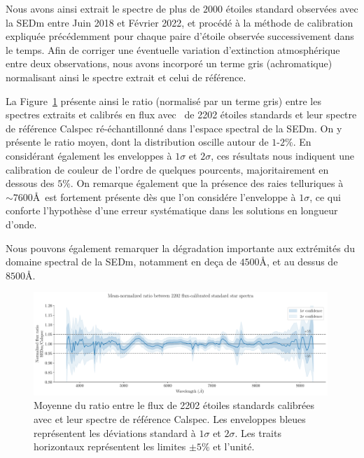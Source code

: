 \documentclass[../main/main.tex]{subfiles}
\begin{document}
Nous avons ainsi extrait le spectre de plus de $2000$ étoiles standard
observées avec la SEDm entre Juin 2018 et Février 2022, et procédé
à la méthode de calibration expliquée précédemment pour chaque paire d'étoile observée
successivement dans le temps.
Afin de corriger une éventuelle variation d'extinction atmosphérique
entre deux observations, nous avons incorporé un terme gris
(achromatique) normalisant ainsi le spectre extrait et celui de référence.

La Figure~\ref{fig:allratio_std} présente ainsi le ratio (normalisé par
un terme gris) entre les spectres extraits et calibrés en flux avec \hypergal\ de 2202 étoiles
standards et leur spectre de référence Calspec ré-échantillonné dans
l'espace spectral de la SEDm. On y présente le ratio moyen, dont la
distribution oscille autour de $1$-$2\%$. En considérant également les
enveloppes à $1\sigma$ et $2\sigma$, ces résultats nous indiquent une
calibration de couleur de l'ordre de quelques pourcents, majoritairement
en dessous des $5\%$. On remarque également que la présence des raies
telluriques à $\sim7600$\AA\ est fortement présente dès que l'on
considére l'enveloppe à $1\sigma$, ce qui conforte l'hypothèse d'une
erreur systématique dans les solutions en longueur d'onde.

Nous pouvons également remarquer la dégradation importante aux
extrémités du domaine spectral de la SEDm, notamment en deça de
$4500$\AA, et au dessus de $8500$\AA.

\begin{figure}[ht]
  \centering
  \includegraphics[width=0.99\textwidth]{../figures/06_irf/fluxcalstd_all_ratio.pdf}
  \caption[Moyenne du ratio entre le flux de 2202
  étoiles standards et leur spectre de
  référence.]{Moyenne du ratio entre le flux de 2202
    étoiles standards calibrées avec \hypergal et leur spectre de
    référence Calspec. Les enveloppes bleues représentent les déviations
    standard à $1\sigma$ et $2\sigma$. Les traits horizontaux représentent
    les limites $\pm5\%$ et l'unité.}
  \label{fig:allratio_std}
\end{figure}
\end{document}
